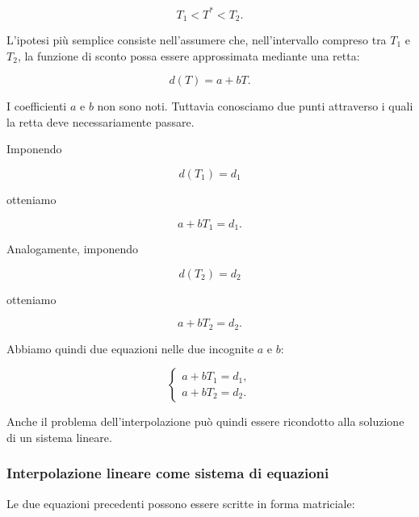 \begin{equation*}
    T_1<T^*<T_2.
\end{equation*}

L'ipotesi più semplice consiste nell'assumere che, nell'intervallo
compreso tra $T_1$ e $T_2$, la funzione di sconto possa essere
approssimata mediante una retta:

\begin{equation*}
    d(T)=a+bT.
    \label{eq:linear-interpolation}
\end{equation*}

I coefficienti $a$ e $b$ non sono noti. Tuttavia conosciamo due punti
attraverso i quali la retta deve necessariamente passare.

Imponendo

\begin{equation*}
    d(T_1)=d_1
\end{equation*}

otteniamo

\begin{equation*}
    a+bT_1=d_1.
\end{equation*}

Analogamente, imponendo

\begin{equation*}
    d(T_2)=d_2
\end{equation*}

otteniamo

\begin{equation*}
    a+bT_2=d_2.
\end{equation*}

Abbiamo quindi due equazioni nelle due incognite $a$ e $b$:

\begin{equation*}
\begin{cases}
a+bT_1=d_1,\\
a+bT_2=d_2.
\end{cases}
\end{equation*}

Anche il problema dell'interpolazione può quindi essere ricondotto
alla soluzione di un sistema lineare.


\subsubsection{Interpolazione lineare come sistema di equazioni}

Le due equazioni precedenti possono essere scritte in forma
matriciale:

